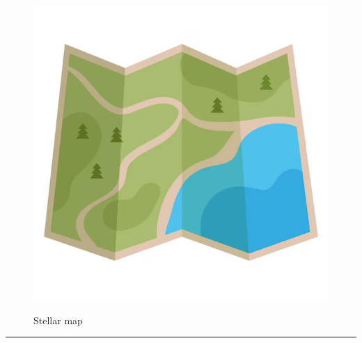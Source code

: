 \documentclass{article}
\begin{document}
    \begin{figure}[H]
        \centering
        \begin{minipage}{0.25\textwidth}
            \centering
            \includegraphics[width=\textwidth]{../SurvivalItemImages/map}
        \end{minipage}\hfill
        \begin{minipage}{0.7\textwidth}
            \centering
            \Large Stellar map
        \end{minipage}
    \end{figure}
    \vspace{-0.8em}
    \noindent\rule{\textwidth}{0.4pt}
            
\end{document}
